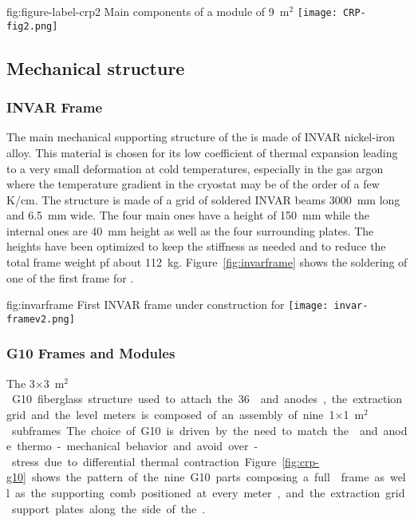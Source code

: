 \begin{dunefigure}{fig:figure-label-crp2}
{Main components of a  module of  \SI{9}{m$^{2}$}}
\texttt{[image: CRP-fig2.png]}
\end{dunefigure}

\subsection{Mechanical structure}
\label{sec:fddp-crp-mechanics}
\subsubsection{INVAR Frame}

The main mechanical supporting structure of the  is made of INVAR nickel-iron alloy. This material is chosen for its low coefficient of thermal expansion leading to a very small deformation at cold temperatures, especially in the gas argon where the temperature gradient in the cryostat may be of the order of a few \si{K/cm}.
The structure is made of a grid of soldered INVAR beams \SI{3000}{mm} long and \SI{6.5}{mm} wide. The four main ones have a height of \SI{150}{mm} while the internal ones are \SI{40}{mm} height as well as the four surrounding plates. The heights have been optimized to keep the stiffness as needed and to reduce the total frame weight pf %
 about \SI{112}{kg}.
Figure~\ref{fig:invarframe} shows the soldering of one of the first  frame for .

\begin{dunefigure}{fig:invarframe}
{First  INVAR frame under construction for }
\texttt{[image: invar-framev2.png]}
\end{dunefigure}

\subsubsection{G10 Frames and Modules}
\label{sec:invar-frame}

The \num{3}$\times$\SI{3}{m$^{2}$}  G10 fiberglass structure used to attach the \num{36}  and anodes, the extraction grid and the level meters is composed of an assembly of nine \num{1}$\times$\SI{1}{m$^{2}$} subframes. The choice of G10 is driven by the need to match the  and anode thermo-mechanical behavior and avoid over-stress due to differential thermal contraction. 
Figure~\ref{fig:crp-g10} shows the pattern of the nine G10 parts composing a full  frame as well as the supporting comb positioned at every meter, and the extraction grid support plates along the side of the .

